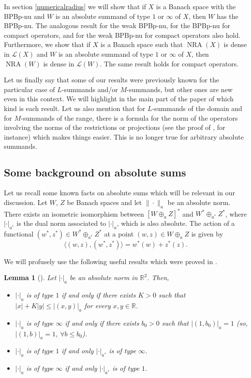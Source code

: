 \documentclass[10pt,a4paper]{amsart}
\theoremstyle{plain}
\newtheorem{lemma}[theorem]{Lemma}
\theoremstyle{definition}
\newcommand{\R}{\mathbb{R}}
\DeclareMathOperator{\NRA}{NRA}
\renewcommand{\leq}{\leqslant}
\begin{document}
In section \ref{numericalradius} we will show that if $X$ is a Banach space with the BPBp-nu and $W$ is an absolute summand of type $1$ or $\infty$ of $X$, then $W$ has the BPBp-nu. The analogous result for the weak BPBp-nu, for the BPBp-nu for compact operators, and for the weak BPBp-nu for compact operators also hold. Furthermore, we show that if $X$ is a Banach space such that $\NRA(X)$ is dense in $\mathcal{L}(X)$ and $W$ is an absolute summand of type $1$ or $\infty$ of $X$, then $\NRA(W)$ is dense in $\mathcal{L}(W)$. The same result holds for compact operators.

Let us finally say that some of our results were previously known for the particular case of $L$-summands and/or $M$-summands, but other ones are new even in this context. We will highlight in the main part of the paper of which kind is each result. Let us also mention that for $L$-summands of the domain and for $M$-summands of the range, there is a formula for the norm of the operators involving the norms of the restrictions or projections (see the proof of \cite[Lemma 2]{PS}, for instance) which makes things easier. This is no longer true for arbitrary absolute summands.


\subsection{Some background on absolute sums}\label{subsection:absolute-sum}
Let us recall some known facts on absolute sums which will be relevant in our discussion. Let $W$, $Z$ be Banach spaces and let $\|\cdot\|_a$ be an absolute norm. There exists an isometric isomorphism between $[W \oplus_a Z]^*$ and $W^* \oplus_{a^*} Z^*$, where $| \cdot |_{a^*}$ is the dual norm associated to $| \cdot |_a$, which is also absolute. The action of a functional $(w^*, z^*) \in W^* \oplus_{a^*} Z^*$ at a point $(w, z) \in W \oplus_a Z$ is given by
\begin{equation*}
\langle (w, z), (w^*, z^*) \rangle = w^*(w) + z^*(z).
\end{equation*}

We will profusely use the following useful results which were proved in \cite{Paya}.

\begin{lemma}[\mbox{\cite[Propositions 5.3, 5.5, and 5.6]{Paya}}]\label{charac} Let $| \cdot |_a$ be an absolute norm in $\R^2$. Then,
	\begin{itemize}
		\item[(a)] $| \cdot |_a$ is of type $1$ if and only if there exists $K > 0$ such that $|x| + K |y| \leq |(x, y)|_a$ for every $x,y\in \R$.
		\item[(b)] $|\cdot |_a$ is of type $\infty$ if and only if there exists $b_0 > 0$ such that $|(1, b_0)|_a = 1$ (so, $|(1,b)|_a=1$, $\forall b\leq b_0$).
		\item[(c)] $| \cdot |_a$ is of type $1$ if and only $| \cdot |_{a^*}$ is of type $\infty$.
		\item[(d)] $| \cdot |_a$ is of type $\infty$ if and only $| \cdot |_{a^*}$ is of type $1$.
	\end{itemize}
\end{lemma}
\end{document}
